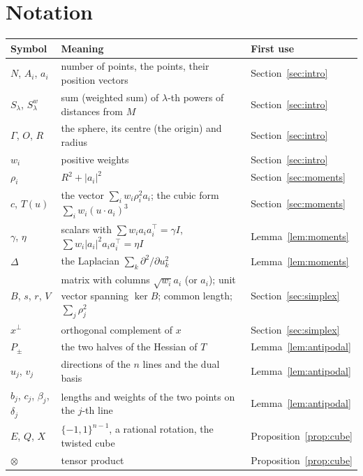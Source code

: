 \documentclass[11pt]{article}
\theoremstyle{remark}
\begin{document}
\section{Notation}\label{app:notation}
\begin{center}
\begin{tabular}{lp{8.4cm}l}
\toprule
Symbol & Meaning & First use\\
\midrule
$N$, $A_i$, $a_i$ & number of points, the points, their position vectors & Section~\ref{sec:intro}\\
$S_\lambda$, $S^w_\lambda$ & sum (weighted sum) of $\lambda$-th powers of distances from $M$ & Section~\ref{sec:intro}\\
$\Gamma$, $O$, $R$ & the sphere, its centre (the origin) and radius & Section~\ref{sec:intro}\\
$w_i$ & positive weights & Section~\ref{sec:intro}\\
$\rho_i$ & $R^2+|a_i|^2$ & Section~\ref{sec:moments}\\
$c$, $T(u)$ & the vector $\sum_iw_i\rho_i^2a_i$; the cubic form $\sum_iw_i(u\cdot a_i)^3$ & Section~\ref{sec:moments}\\
$\gamma$, $\eta$ & scalars with $\sum w_ia_ia_i^{\top}=\gamma I$, $\sum w_i|a_i|^2a_ia_i^{\top}=\eta I$ & Lemma~\ref{lem:moments}\\
$\Delta$ & the Laplacian $\sum_k\partial^2/\partial u_k^2$ & Lemma~\ref{lem:moments}\\
$B$, $s$, $r$, $V$ & matrix with columns $\sqrt{w_i}a_i$ (or $a_i$); unit vector spanning $\ker B$; common length; $\sum_j\rho_j^2$ & Section~\ref{sec:simplex}\\
$x^{\perp}$ & orthogonal complement of $x$ & Section~\ref{sec:simplex}\\
$P_\pm$ & the two halves of the Hessian of $T$ & Lemma~\ref{lem:antipodal}\\
$u_j$, $v_j$ & directions of the $n$ lines and the dual basis & Lemma~\ref{lem:antipodal}\\
$b_j$, $c_j$, $\beta_j$, $\delta_j$ & lengths and weights of the two points on the $j$-th line & Lemma~\ref{lem:antipodal}\\
$E$, $Q$, $X$ & $\{-1,1\}^{n-1}$, a rational rotation, the twisted cube & Proposition~\ref{prop:cube}\\
$\otimes$ & tensor product & Proposition~\ref{prop:cube}\\
\bottomrule
\end{tabular}
\end{center}
\end{document}
